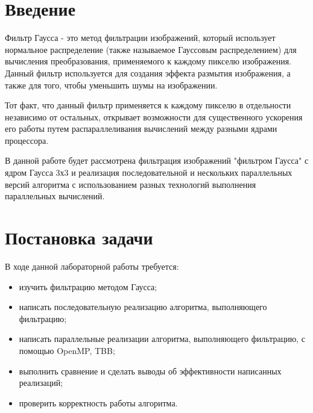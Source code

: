 \documentclass{report}
\begin{document}
\setcounter{page}{2}

\tableofcontents
\newpage

\section*{Введение}
\par Фильтр Гаусса - это метод фильтрации изображений, который использует нормальное распределение (также называемое Гауссовым распределением) для вычисления преобразования, применяемого к каждому пикселю изображения. Данный фильтр используется для создания эффекта размытия изображения, а также для того, чтобы уменьшить шумы на изображении.
\par Тот факт, что данный фильтр применяется к каждому пикселю в отдельности независимо от остальных, открывает возможности для существенного ускорения его работы путем распараллеливания вычислений между разными ядрами процессора.
\par В данной работе будет рассмотрена фильтрация изображений "фильтром Гаусса" с ядром Гаусса 3х3 и реализация последовательной и нескольких параллельных версий алгоритма с использованием разных технологий выполнения параллельных вычислений.
\newpage

\section*{Постановка задачи}
\par В ходе данной лабораторной работы требуется:
    \begin{itemize}
        \item изучить фильтрацию методом Гаусса;
        \item написать последовательную реализацию алгоритма, выполняющего фильтрацию;
        \item написать параллельные реализации алгоритма, выполняющего фильтрацию, с помощью OpenMP, TBB;
        \item выполнить сравнение и сделать выводы об эффективности написанных реализаций;
        \item проверить корректность работы алгоритма.
    \end{itemize}
\newpage

\end{document}
